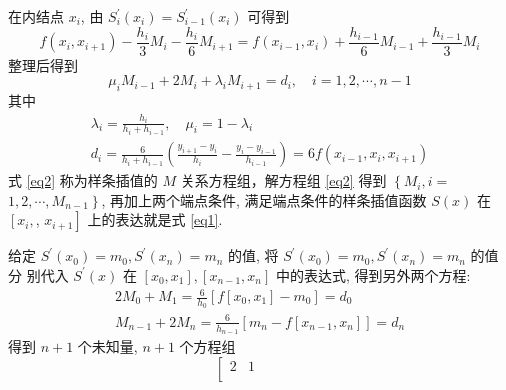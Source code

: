 \documentclass[12pt,a4paper,UTF8]{ctexart}
\theoremstyle{nonumberplain}
\begin{document}
\begin{enumerate}
\begin{enumerate}
                    在内结点 $x_{i}$, 由 $S_{i}^{\prime}\left(x_{i}\right)=S_{i-1}^{\prime}\left(x_{i}\right)$ 可得到
                    \begin{equation}\label{eq2}
                        f\left(x_{i}, x_{i+1}\right)-\frac{h_{i}}{3} M_{i}-\frac{h_{i}}{6} M_{i+1}=f\left(x_{i-1}, x_{i}\right)+\frac{h_{i-1}}{6} M_{i-1}+\frac{h_{i-1}}{3} M_{i}
                    \end{equation}
                    整理后得到
                    \begin{equation}\label{eq3}
                        \mu_{i} M_{i-1}+2 M_{i}+\lambda_{i} M_{i+1}=d_{i}, \quad i=1,2, \cdots, n-1
                    \end{equation}
                    其中
                    $$
                        \begin{array}{c}
                            \lambda_{i}=\frac{h_{i}}{h_{i}+h_{i-1}}, \quad \mu_{i}=1-\lambda_{i} \\
                            d_{i}=\frac{6}{h_{i}+h_{i-1}}\left(\frac{y_{i+1}-y_{i}}{h_{i}}-\frac{y_{i}-y_{i-1}}{h_{i-1}}\right)=6 f\left(x_{i-1}, x_{i}, x_{i+1}\right)
                        \end{array}
                    $$
                    式 \ref{eq2} 称为样条插值的 $M$ 关系方程组，解方程组 \ref{eq2} 得到 $\left\{M_{i}, i=\right.$ $\left.1,2, \cdots, M_{n-1}\right\}$, 再加上两个端点条件, 满足端点条件的样条插值函数 $S(x)$ 在 $\left[x_{i},\right.$, $\left.x_{i+1}\right]$ 上的表达就是式 \ref{eq1}.
                    \par 给定 $S^{\prime}\left(x_{0}\right)=m_{0}, S^{\prime}\left(x_{n}\right)=m_{n}$ 的值, 将 $S^{\prime}\left(x_{0}\right)=m_{0}, S^{\prime}\left(x_{n}\right)=m_{n}$ 的值分
                    别代入 $S^{\prime}(x)$ 在 $\left[x_{0}, x_{1}\right],\left[x_{n-1}, x_{n}\right]$ 中的表达式, 得到另外两个方程:
                    $$
                        \begin{array}{c}
                            2 M_{0}+M_{1}=\frac{6}{h_{0}}\left[f\left[x_{0}, x_{1}\right]-m_{0}\right]=d_{0} \\
                            M_{n-1}+2 M_{n}=\frac{6}{h_{n-1}}\left[m_{n}-f\left[x_{n-1}, x_{n}\right]\right]=d_{n}
                        \end{array}
                    $$
                    得到 $n+1$ 个未知量, $n+1$ 个方程组
                    $$
                        \left[\begin{array}{cccccc}
                                2        & 1        &             &             &        &               \\

\end{array}$$
\end{enumerate}
\end{enumerate}
\end{document}
